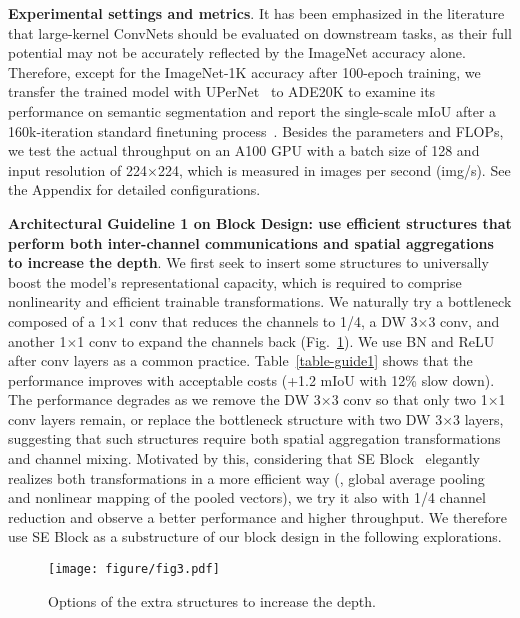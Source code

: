\documentclass[10pt,twocolumn,letterpaper]{article}
\begin{document}
\noindent\textbf{Experimental settings and metrics}. It has been emphasized in the literature~\cite{ding2022scaling} that large-kernel ConvNets should be evaluated on downstream tasks, as their full potential may not be accurately reflected by the ImageNet accuracy alone. Therefore, except for the ImageNet-1K accuracy after 100-epoch training, we transfer the trained model with UPerNet~\cite{xiao2018unified} to ADE20K to examine its performance on semantic segmentation and report the single-scale mIoU after a 160k-iteration standard finetuning process~\cite{mmseg2020}. Besides the parameters and FLOPs, we test the actual throughput on an A100 GPU with a batch size of 128 and input resolution of 224$\times$224, which is measured in images per second (img/s). See the Appendix for detailed configurations.

\noindent\textbf{Architectural Guideline 1 on Block Design: use efficient structures that perform both inter-channel communications and spatial aggregations to increase the depth}. We first seek to insert some structures to universally boost the model's representational capacity, which is required to comprise nonlinearity and efficient trainable transformations. We naturally try a bottleneck composed of a 1$\times$1 conv that reduces the channels to 1/4, a DW 3$\times$3 conv, and another 1$\times$1 conv to expand the channels back (Fig.~\ref{fig-se}). We use BN and ReLU after conv layers as a common practice. Table~\ref{table-guide1} shows that the performance improves with acceptable costs (+1.2 mIoU with 12\% slow down). The performance degrades as we remove the DW 3$\times$3 conv so that only two 1$\times$1 conv layers remain, or replace the bottleneck structure with two DW 3$\times$3 layers, suggesting that such structures require both spatial aggregation transformations and channel mixing. Motivated by this, considering that SE Block~\cite{hu2018squeeze} elegantly realizes both transformations in a more efficient way (\ie, global average pooling and nonlinear mapping of the pooled vectors), we try it also with 1/4 channel reduction and observe a better performance and higher throughput. We therefore use SE Block as a substructure of our block design in the following explorations.

	\begin{figure}
		\begin{center}
			\texttt{[image: figure/fig3.pdf]}
			\vspace{-0.3in}
			\caption{Options of the extra structures to increase the depth.}
			\label{fig-se}
			\vspace{-0.25in}
		\end{center}
	\end{figure}
\end{document}
